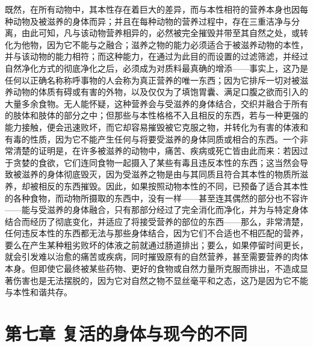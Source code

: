 既然，在所有动物中，其本性存在着巨大的差异，而与本性相符的营养本身也因每种动物及被滋养的身体而异；并且在每种动物的营养过程中，存在三重洁净与分离，由此可知，凡与该动物营养相异的，必然被完全摧毁并带至其自然之处，或转化为他物，因为它不能与之融合；滋养之物的能力必须适合于被滋养动物的本性，并与该动物的能力相符；而这种能力，在通过为此目的而设置的过滤筛滤，并经过自然净化方式的彻底净化之后，必须成为对质料最真确的增添——事实上，这乃是任何以正确名称称呼事物的人会称为真正营养的唯一东西；因为它排斥一切对被滋养动物的体质有碍或有害的外物，以及仅仅为了填饱胃囊、满足口腹之欲而引入的大量多余食物。无人能怀疑，这种营养会与受滋养的身体结合，交织并融合于所有的肢体和肢体的部分之中；但那些与本性格格不入且相反的东西，若与一种更强的能力接触，便会迅速败坏，而它却容易摧毁被它克服之物，并转化为有害的体液和有毒的性质，因为它不能产生任何与将要受滋养的身体同质或相合的东西。一个非常清楚的证明是，在许多被滋养的动物中，痛苦、疾病或死亡皆由此而来：若因过于贪婪的食欲，它们连同食物一起摄入了某些有毒且违反本性的东西；这当然会导致被滋养的身体彻底毁灭，因为受滋养之物是由与其同质且符合其本性的物质所滋养，却被相反的东西摧毁。因此，如果按照动物本性的不同，已预备了适合其本性的各种食物，而动物所摄取的东西中，没有一样——甚至连其偶然的部分也不容许——能与受滋养的身体融合，只有那部分经过了完全消化而净化，并为与特定身体结合而经历了彻底变化，并适应了将接受营养的部位的东西——那么，非常清楚，任何违反本性的东西都无法与那些身体结合，因为它们不合适也不相匹配的营养，要么在产生某种粗劣败坏的体液之前就通过肠道排出；要么，如果停留时间更长，就会引发难以治愈的痛苦或疾病，同时摧毁原有的自然营养，甚至需要营养的肉体本身。但即使它最终被某些药物、更好的食物或自然力量所克服而排出，不造成显著伤害也是无法摆脱的，因为它对自然之物不显丝毫平和之态，这乃是因为它不能与本性和谐共存。\par


\section{第七章 复活的身体与现今的不同}

